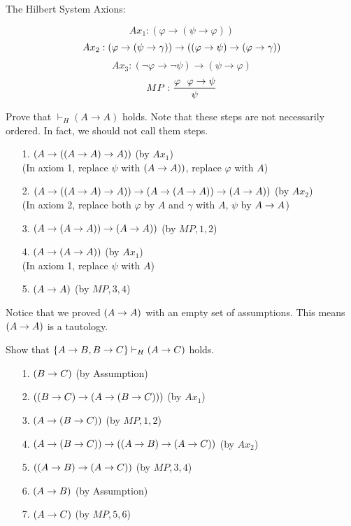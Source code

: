 \documentclass[english, 11pt]{article}
\begin{document}
  The Hilbert System Axions:

  \[ Ax_1 : (\varphi \rightarrow (\psi \rightarrow \varphi)) \]
  \[ Ax_2 : (\varphi \rightarrow (\psi \rightarrow \gamma)) \rightarrow ((\varphi \rightarrow \psi) \rightarrow (\varphi \rightarrow \gamma)) \]
  \[ Ax_3 : (\neg \varphi \rightarrow \neg \psi) \rightarrow (\psi \rightarrow \varphi) \]
  \[ MP : \frac{ \varphi \ \ \varphi \rightarrow \psi}{\psi} \]

  \begin{note}

  \end{note}

  \begin{exmp}
    Prove that $\vdash_H (A \rightarrow A)$ holds. Note that these steps are not necessarily ordered. In fact, we should not call them steps. \\

    \begin{itemize}
      \item[1.] $(A \rightarrow ((A \rightarrow A) \rightarrow A))$ \hfill (by $Ax_1$) \\
      (In axiom 1, replace $\psi$ with $(A \rightarrow A))$, replace $\varphi$ with $A$)
      \item[2.] $(A \rightarrow (( A \rightarrow A) \rightarrow A)) \rightarrow (A \rightarrow (A \rightarrow A )) \rightarrow (A \rightarrow A))$ \hfill (by $Ax_2$) \\
      (In axiom 2, replace both $\varphi$ by $A$ and $\gamma$ with $A$, $\psi$ by $A \rightarrow A$)
      \item[3.] $(A \rightarrow (A \rightarrow A)) \rightarrow (A \rightarrow A))$ \hfill (by $MP, 1, 2$)
      \item[4.] $( A \rightarrow (A \rightarrow A))$ \hfill (by $Ax_1$) \\
      (In axiom 1, replace $\psi$ with $A$)
      \item[5.] $(A \rightarrow A)$ \hfill (by $MP,3,4$)
    \end{itemize}
    Notice that we proved $(A \rightarrow A)$ with an empty set of assumptions. This means $(A \rightarrow A)$ is a tautology.
  \end{exmp}

  \begin{exmp}
    Show that $\{A \rightarrow B, B \rightarrow C\} \vdash_H (A \rightarrow C)$ holds.
    \begin{itemize}
      \item[1.] $(B \rightarrow C)$ \hfill (by Assumption)
      \item[2.] $((B \rightarrow C) \rightarrow (A \rightarrow (B \rightarrow C)))$ \hfill (by $Ax_1$)
      \item[3.] $(A \rightarrow (B \rightarrow C))$ \hfill (by $MP,1,2$)
      \item[4.] $(A \rightarrow (B \rightarrow C)) \rightarrow ((A \rightarrow B) \rightarrow (A \rightarrow C))$ \hfill (by $Ax_2$)
      \item[5.] $((A \rightarrow B) \rightarrow (A \rightarrow C))$ \hfill (by $MP,3,4$)
      \item[6.] $(A \rightarrow B)$ \hfill (by Assumption)
      \item[7.] $(A \rightarrow C)$ \hfill (by $MP,5,6$)
    \end{itemize}
  \end{exmp}
\end{document}
